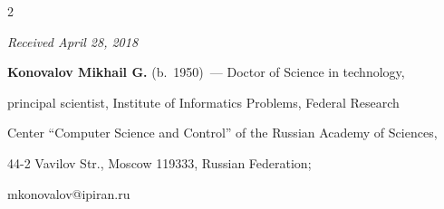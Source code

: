 \begin{multicols}{2}
{{





 }


 }





\end{multicols}





\vspace*{-6pt}





\hfill{\small\textit{Received April 28, 2018}}















\Contr





\noindent


\textbf{Konovalov Mikhail G.} (b.\ 1950)~--- Doctor of Science in technology, 


principal scientist, Institute of Informatics Problems, Federal Research 


Center ``Computer Science and Control'' of the Russian Academy of Sciences, 


44-2 Vavilov Str., Moscow 119333, Russian Federation; 


\mbox{mkonovalov@ipiran.ru}





\vspace*{3pt}





